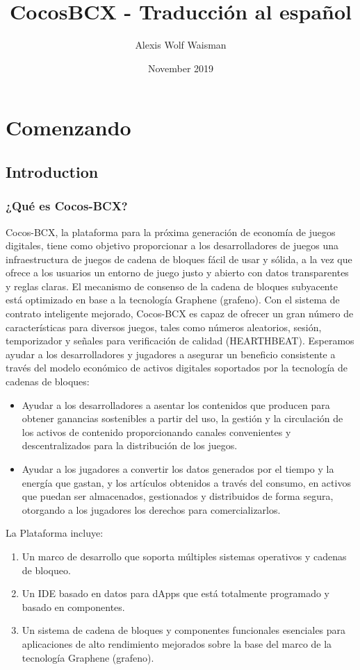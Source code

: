 \documentclass{article}
\title{CocosBCX - Traducción al español}
\author{Alexis Wolf Waisman }
\date{November 2019}
\begin{document}
\maketitle
\section{Comenzando}
\subsection{Introduction}
\subsubsection{¿Qué es Cocos-BCX?}
Cocos-BCX, la plataforma para la próxima generación de economía de juegos digitales, tiene como objetivo proporcionar a los desarrolladores de juegos una infraestructura de juegos de cadena de bloques fácil de usar y sólida, a la vez que ofrece a los usuarios un entorno de juego justo y abierto con datos transparentes y reglas claras. El mecanismo de consenso de la cadena de bloques subyacente está optimizado en base a la tecnología Graphene (grafeno). Con el sistema de contrato inteligente mejorado, Cocos-BCX es capaz de ofrecer un gran número de características para diversos juegos, tales como números aleatorios, sesión, temporizador y señales para verificación de calidad (HEARTHBEAT).
Esperamos ayudar a los desarrolladores y jugadores a asegurar un beneficio consistente a través del modelo económico de activos digitales soportados por la tecnología de cadenas de bloques:
\begin{itemize}
    \item Ayudar a los desarrolladores a asentar los contenidos que producen para obtener ganancias sostenibles a partir del uso, la gestión y la circulación de los activos de contenido proporcionando canales convenientes y descentralizados para la distribución de los juegos.
    \item Ayudar a los jugadores a convertir los datos generados por el tiempo y la energía que gastan, y los artículos obtenidos a través del consumo, en activos que puedan ser almacenados, gestionados y distribuidos de forma segura, otorgando a los jugadores los derechos para comercializarlos.
\end{itemize}

La Plataforma incluye:
\begin{enumerate}
    \item Un marco de desarrollo que soporta múltiples sistemas operativos y cadenas de bloqueo.
    \item Un IDE basado en datos para dApps que está totalmente programado y basado en componentes.
    \item Un sistema de cadena de bloques y componentes funcionales esenciales para aplicaciones de alto rendimiento mejorados sobre la base del marco de la tecnología Graphene (grafeno).
\end{enumerate}
\end{document}
